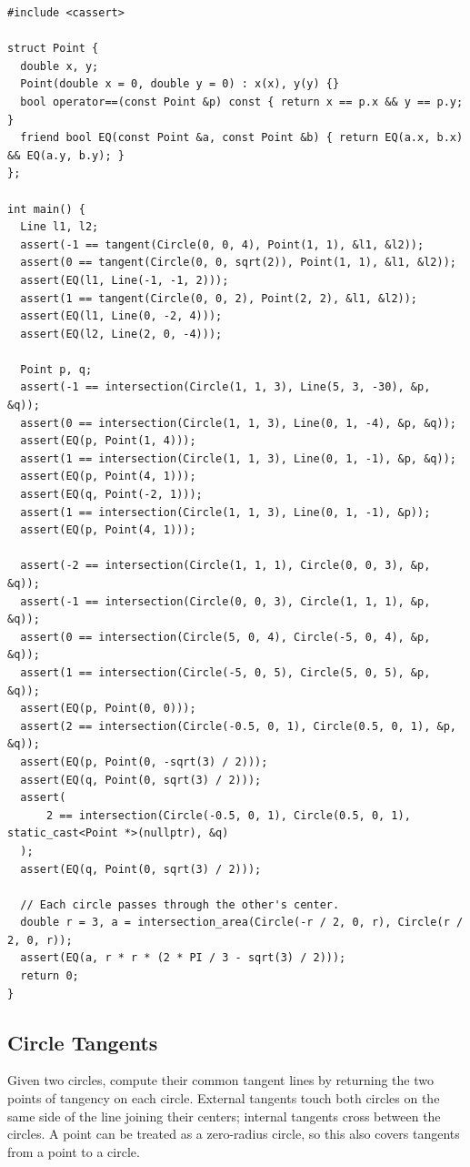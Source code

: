\begin{lstlisting}[style=cpp]
#include <cassert>

struct Point {
  double x, y;
  Point(double x = 0, double y = 0) : x(x), y(y) {}
  bool operator==(const Point &p) const { return x == p.x && y == p.y; }
  friend bool EQ(const Point &a, const Point &b) { return EQ(a.x, b.x) && EQ(a.y, b.y); }
};

int main() {
  Line l1, l2;
  assert(-1 == tangent(Circle(0, 0, 4), Point(1, 1), &l1, &l2));
  assert(0 == tangent(Circle(0, 0, sqrt(2)), Point(1, 1), &l1, &l2));
  assert(EQ(l1, Line(-1, -1, 2)));
  assert(1 == tangent(Circle(0, 0, 2), Point(2, 2), &l1, &l2));
  assert(EQ(l1, Line(0, -2, 4)));
  assert(EQ(l2, Line(2, 0, -4)));

  Point p, q;
  assert(-1 == intersection(Circle(1, 1, 3), Line(5, 3, -30), &p, &q));
  assert(0 == intersection(Circle(1, 1, 3), Line(0, 1, -4), &p, &q));
  assert(EQ(p, Point(1, 4)));
  assert(1 == intersection(Circle(1, 1, 3), Line(0, 1, -1), &p, &q));
  assert(EQ(p, Point(4, 1)));
  assert(EQ(q, Point(-2, 1)));
  assert(1 == intersection(Circle(1, 1, 3), Line(0, 1, -1), &p));
  assert(EQ(p, Point(4, 1)));

  assert(-2 == intersection(Circle(1, 1, 1), Circle(0, 0, 3), &p, &q));
  assert(-1 == intersection(Circle(0, 0, 3), Circle(1, 1, 1), &p, &q));
  assert(0 == intersection(Circle(5, 0, 4), Circle(-5, 0, 4), &p, &q));
  assert(1 == intersection(Circle(-5, 0, 5), Circle(5, 0, 5), &p, &q));
  assert(EQ(p, Point(0, 0)));
  assert(2 == intersection(Circle(-0.5, 0, 1), Circle(0.5, 0, 1), &p, &q));
  assert(EQ(p, Point(0, -sqrt(3) / 2)));
  assert(EQ(q, Point(0, sqrt(3) / 2)));
  assert(
      2 == intersection(Circle(-0.5, 0, 1), Circle(0.5, 0, 1), static_cast<Point *>(nullptr), &q)
  );
  assert(EQ(q, Point(0, sqrt(3) / 2)));

  // Each circle passes through the other's center.
  double r = 3, a = intersection_area(Circle(-r / 2, 0, r), Circle(r / 2, 0, r));
  assert(EQ(a, r * r * (2 * PI / 3 - sqrt(3) / 2)));
  return 0;
}
\end{lstlisting}
\subsection{Circle Tangents}
\label{sec:7.2.5}
Given two circles, compute their common tangent lines by returning the two points of tangency on each circle. External tangents touch both circles on the same side of the line joining their centers; internal tangents cross between the circles. A point can be treated as a zero-radius circle, so this also covers tangents from a point to a circle.

